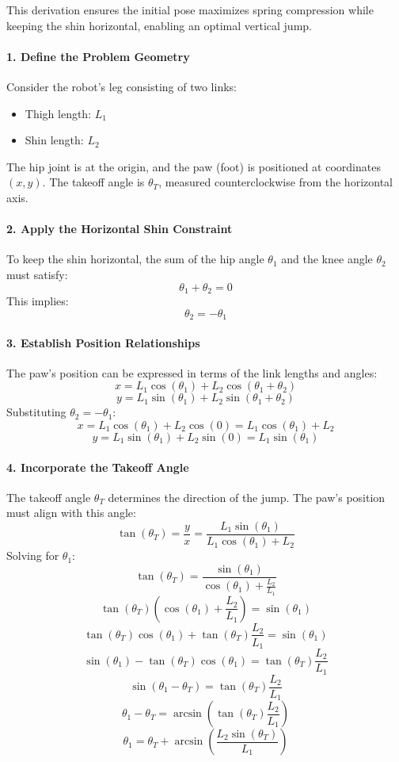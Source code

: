 This derivation ensures the initial pose maximizes spring compression while keeping the shin horizontal, enabling an optimal vertical jump.







\paragraph{1. Define the Problem Geometry}

Consider the robot's leg consisting of two links:
\begin{itemize}
    \item Thigh length: \( L_1 \)
    \item Shin length: \( L_2 \)
\end{itemize}
The hip joint is at the origin, and the paw (foot) is positioned at coordinates \( (x, y) \). The takeoff angle is \( \theta_T \), measured counterclockwise from the horizontal axis.

\paragraph{2. Apply the Horizontal Shin Constraint}

To keep the shin horizontal, the sum of the hip angle \( \theta_1 \) and the knee angle \( \theta_2 \) must satisfy:
\[
\theta_1 + \theta_2 = 0
\]
This implies:
\[
\theta_2 = -\theta_1
\]

\paragraph{3. Establish Position Relationships}

The paw's position can be expressed in terms of the link lengths and angles:
\[
x = L_1 \cos(\theta_1) + L_2 \cos(\theta_1 + \theta_2)
\]
\[
y = L_1 \sin(\theta_1) + L_2 \sin(\theta_1 + \theta_2)
\]
Substituting \( \theta_2 = -\theta_1 \):
\[
x = L_1 \cos(\theta_1) + L_2 \cos(0) = L_1 \cos(\theta_1) + L_2
\]
\[
y = L_1 \sin(\theta_1) + L_2 \sin(0) = L_1 \sin(\theta_1)
\]

\paragraph{4. Incorporate the Takeoff Angle}

The takeoff angle \( \theta_T \) determines the direction of the jump. The paw's position must align with this angle:
\[
\tan(\theta_T) = \frac{y}{x} = \frac{L_1 \sin(\theta_1)}{L_1 \cos(\theta_1) + L_2}
\]
Solving for \( \theta_1 \):
\[
\tan(\theta_T) = \frac{\sin(\theta_1)}{\cos(\theta_1) + \frac{L_2}{L_1}}
\]
\[
\tan(\theta_T) (\cos(\theta_1) + \frac{L_2}{L_1}) = \sin(\theta_1)
\]
\[
\tan(\theta_T) \cos(\theta_1) + \tan(\theta_T) \frac{L_2}{L_1} = \sin(\theta_1)
\]
\[
\sin(\theta_1) - \tan(\theta_T) \cos(\theta_1) = \tan(\theta_T) \frac{L_2}{L_1}
\]
\[
\sin(\theta_1 - \theta_T) = \tan(\theta_T) \frac{L_2}{L_1}
\]
\[
\theta_1 - \theta_T = \arcsin\left(\tan(\theta_T) \frac{L_2}{L_1}\right)
\]
\[
\theta_1 = \theta_T + \arcsin\left(\frac{L_2 \sin(\theta_T)}{L_1}\right)
\]

